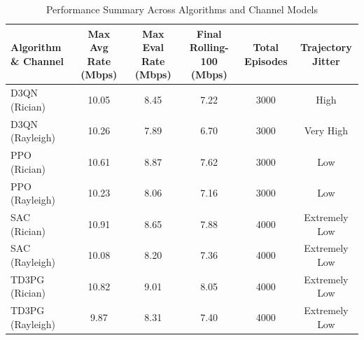 \documentclass[journal,onecolumn]{IEEEtran}
\begin{document}
\begin{table}[t]
\caption{Performance Summary Across Algorithms and Channel Models}
\label{tab:comparison}
\centering
\renewcommand{\arraystretch}{1.15}
\begin{tabular}{lccccc}
\toprule
\textbf{Algorithm \& Channel} &
\textbf{Max Avg Rate (Mbps)} &
\textbf{Max Eval Rate (Mbps)} &
\textbf{Final Rolling-100 (Mbps)} &
\textbf{Total Episodes} &
\textbf{Trajectory Jitter} \\
\midrule

D3QN (Rician)    & 10.05 & 8.45 & 7.22 & 3000 & High \\
D3QN (Rayleigh)  & 10.26 & 7.89 & 6.70 & 3000 & Very High \\
PPO (Rician)     & 10.61 & 8.87 & 7.62 & 3000 & Low \\
PPO (Rayleigh)   & 10.23 & 8.06 & 7.16 & 3000 & Low \\
SAC (Rician)     & 10.91 & 8.65 & 7.88 & 4000 & Extremely Low \\
SAC (Rayleigh)   & 10.08 & 8.20 & 7.36 & 4000 & Extremely Low \\
TD3PG (Rician)   & 10.82 & 9.01 & 8.05 & 4000 & Extremely Low \\
TD3PG (Rayleigh) & 9.87 & 8.31 & 7.40 & 4000 & Extremely Low \\

\bottomrule
\end{tabular}
\end{table}
\end{document}
